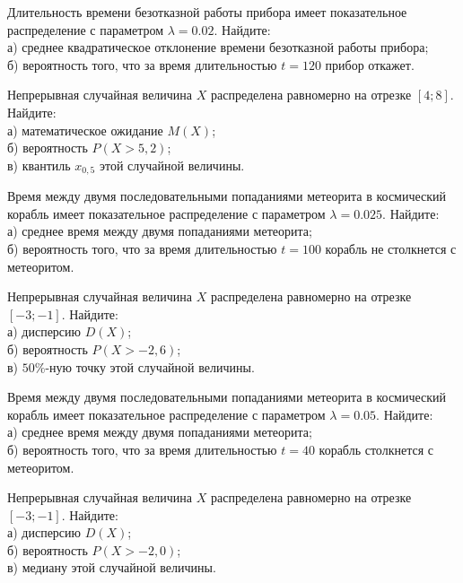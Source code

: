\vfill

\z Длительность времени безотказной работы прибора имеет показательное распределение с параметром $\lambda = 0.02$. Найдите: \\ \quad а) среднее квадратическое отклонение времени безотказной работы прибора; \\ \quad б) вероятность того, что за время длительностью $t = 120$ прибор  откажет.
 

\vfill

\newpage\setcounter{zad}{0}

\z Непрерывная случайная величина $X$ распределена равномерно на отрезке $[4; 8]$. Найдите: \\ \quad а) математическое ожидание $M(X)$; \\ \quad б) вероятность $P(X>5{,}2)$; \\ \quad в) квантиль $x_{0{,}5}$ этой случайной величины.


\vfill

\z Время между двумя последовательными попаданиями метеорита в космический корабль имеет показательное распределение с параметром $\lambda = 0.025$. Найдите: \\ \quad а) среднее время между двумя попаданиями метеорита; \\ \quad б) вероятность того, что за время длительностью $t = 100$ корабль не столкнется с метеоритом.
 

\vfill

\newpage\setcounter{zad}{0}

\z Непрерывная случайная величина $X$ распределена равномерно на отрезке $[-3; -1]$. Найдите: \\ \quad а) дисперсию $D(X)$; \\ \quad б) вероятность $P(X>-2{,}6)$; \\ \quad в) $50\%$-ную точку этой случайной величины.


\vfill

\z Время между двумя последовательными попаданиями метеорита в космический корабль имеет показательное распределение с параметром $\lambda = 0.05$. Найдите: \\ \quad а) среднее время между двумя попаданиями метеорита; \\ \quad б) вероятность того, что за время длительностью $t = 40$ корабль  столкнется с метеоритом.
 

\vfill

\newpage\setcounter{zad}{0}

\z Непрерывная случайная величина $X$ распределена равномерно на отрезке $[-3; -1]$. Найдите: \\ \quad а) дисперсию $D(X)$; \\ \quad б) вероятность $P(X>-2{,}0)$; \\ \quad в) медиану этой случайной величины.



